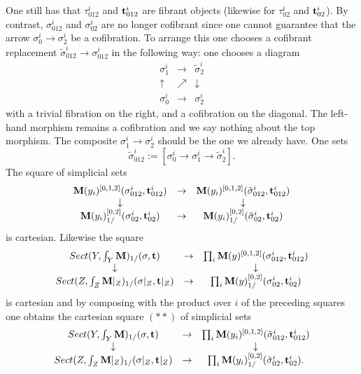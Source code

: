 One still has that $\tau ^i_{012}$ and ${\bf t}^i_{012}$ are fibrant objects
(likewise for $\tau ^i_{02}$ and ${\bf t}^i_{02}$). By contrast, $\sigma
^i_{012}$ and $\sigma ^i_{02}$ are no longer cofibrant since one cannot
guarantee that the arrow $\sigma ^i_0\rightarrow \sigma ^i_2$ be a
cofibration.
To arrange this one chooses a cofibrant replacement
$\tilde{\sigma}^i_{012}\rightarrow  \sigma ^i_{012}$ in the following
way: one
chooses a diagram
$$
\begin{array}{ccc}
\sigma ^i_1 & \rightarrow & \tilde{\sigma}^i_2\\
\uparrow & \nearrow & \downarrow \\
\sigma ^i_0 & \rightarrow & \sigma ^i_2
\end{array}
$$
with a trivial fibration on the right, and
a cofibration
on the diagonal. The left-hand morphism remains a cofibration and we say
nothing about the top morphism. The composite $\sigma ^i_1\rightarrow \sigma ^i_2$
should be the one we already have. One sets
$$
\tilde{\sigma}^i_{012}:= [\sigma ^i_0\rightarrow \sigma ^i_1 \rightarrow
\tilde{\sigma}^i_2].
$$
The square of simplicial sets
$$
\begin{array}{ccc}
{\bf M} (y_i)^{[0,1,2]}(\sigma ^i_{012},{\bf t} ^i
_{012})
&\rightarrow & {\bf M} (y_i)^{[0,1,2]}(\tilde{\sigma} ^i_{012},{\bf t} ^i
_{012})\\ \downarrow && \downarrow \\
{\bf M} (y_i)^{[0,2]}_{1/}(\sigma ^i_{02},{\bf t}
^i_{02})
& \rightarrow & {\bf M} (y_i)^{[0,2]}_{1/}(\tilde{\sigma} ^i_{02},{\bf t}
^i_{02})
\end{array}
$$
is cartesian. Likewise the square
$$
\begin{array}{ccc}
Sect (Y, \int _Y{\bf M} )_{1/}(\sigma , {\bf t} )
&\rightarrow & \prod _i {\bf M} (y)^{[0,1,2]}(\sigma ^i_{012},{\bf t} ^i
_{012})\\ \downarrow && \downarrow \\
Sect (Z, \int _Z{\bf M} |_Z)_{1/}(\sigma |_Z, {\bf t} |_Z)
& \rightarrow & \prod _i {\bf M} (y)^{[0,2]}_{1/}(\sigma ^i_{02},{\bf t}
^i_{02}) \end{array}
$$
is cartesian and by composing with the product over $i$ of the preceding
squares
one obtains the cartesian square $(\ast \ast )$ of simplicial sets
$$
\begin{array}{ccc}
Sect (Y, \int _Y{\bf M} )_{1/}(\sigma , {\bf t} )
&\rightarrow & \prod _i {\bf M} (y_i)^{[0,1,2]}(\tilde{\sigma} ^i_{012},{\bf t} ^i
_{012})\\ \downarrow && \downarrow \\
Sect (Z, \int _Z{\bf M} |_Z)_{1/}(\sigma |_Z, {\bf t} |_Z)
& \rightarrow & \prod _i {\bf M} (y_i)^{[0,2]}_{1/}(\tilde{\sigma} ^i_{02},{\bf t}
^i_{02}).
\end{array}
$$
